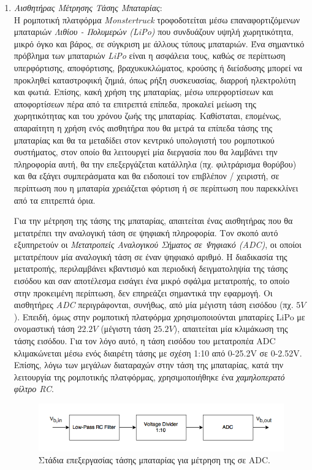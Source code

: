 \begin{enumerate}
\bigskip
\item \textit{Αισθητήρας Μέτρησης Τάσης Μπαταρίας}:\\
Η ρομποτική πλατφόρμα \textit{Monstertruck} τροφοδοτείται μέσω επαναφορτιζόμενων μπαταριών \textit{Λιθίου - Πολυμερών (LiPo)} που συνδυάζουν υψηλή χωρητικότητα, μικρό όγκο και βάρος, σε σύγκριση με άλλους τύπους μπαταριών. Ένα σημαντικό πρόβλημα των μπαταριών \textit{LiPo} είναι η ασφάλεια τους, καθώς σε περίπτωση υπερφόρτισης, αποφόρτισης, βραχυκυκλώματος, κρούσης ή διείσδυσης μπορεί να προκληθεί καταστροφική ζημιά, όπως ρήξη συσκευασίας, διαρροή ηλεκτρολύτη και φωτιά. Επίσης, κακή χρήση της μπαταρίας, μέσω υπερφορτίσεων και αποφορτίσεων πέρα από τα επιτρεπτά επίπεδα, προκαλεί μείωση της χωρητικότητας και του χρόνου ζωής της μπαταρίας. Καθίσταται, επομένως, απαραίτητη η χρήση ενός αισθητήρα που θα μετρά τα επίπεδα τάσης της μπαταρίας και θα τα μεταδίδει στον κεντρικό υπολογιστή του ρομποτικού συστήματος, στον οποίο θα λειτουργεί μία διεργασία που θα λαμβάνει την πληροφορία αυτή, θα την επεξεργάζεται κατάλληλα (πχ. φιλτράρισμα θορύβου) και θα εξάγει συμπεράσματα και θα ειδοποιεί τον επιβλέπον / χειριστή, σε περίπτωση που η μπαταρία χρειάζεται φόρτιση ή σε περίπτωση που παρεκκλίνει από τα επιτρεπτά όρια.

Για την μέτρηση της τάσης της μπαταρίας, απαιτείται ένας αισθητήρας που θα μετατρέπει την αναλογική τάση σε ψηφιακή πληροφορία. Τον σκοπό αυτό εξυπηρετούν οι \textit{Μετατροπείς Αναλογικού Σήματος σε Ψηφιακό (ADC)}, οι οποίοι μετατρέπουν μία αναλογική τάση σε έναν ψηφιακό αριθμό. Η διαδικασία της μετατροπής, περιλαμβάνει κβαντισμό και περιοδική δειγματοληψία της τάσης εισόδου και σαν αποτέλεσμα εισάγει ένα μικρό σφάλμα μετατροπής, το οποίο στην προκειμένη περίπτωση, δεν επηρεάζει σημαντικά την εφαρμογή. Οι αισθητήρες \textit{ADC} περιγράφονται, συνήθως, από μία μέγιστη τάση εισόδου (πχ. $5V$). Επειδή, όμως στην ρομποτική πλατφόρμα χρησιμοποιούνται μπαταρίες LiPo με ονομαστική τάση $22.2V$ (μέγιστη τάση $25.2V$), απαιτείται μία κλιμάκωση της τάσης εισόδου. Για τον λόγο αυτό, η τάση εισόδου του μετατροπέα ADC κλιμακώνεται μέσω ενός διαιρέτη τάσης με σχέση 1:10 από 0-25.2V σε 0-2.52V. Επίσης, λόγω των μεγάλων διαταραχών στην τάση της μπαταρίας, κατά την λειτουργία της ρομποτικής πλατφόρμας, χρησιμοποιήθηκε ένα \textit{χαμηλοπερατό φίλτρο RC}.

\begin{figure}[!ht]
	\centering
	\includegraphics[width=0.8\linewidth]{Chapters/Chapter2/Figures/rc_filter_divider.png}
	\caption{Στάδια επεξεργασίας τάσης μπαταρίας για μέτρηση της σε ADC.}
	\label{fig:rc_filter_divider}
\end{figure}

\end{enumerate}

